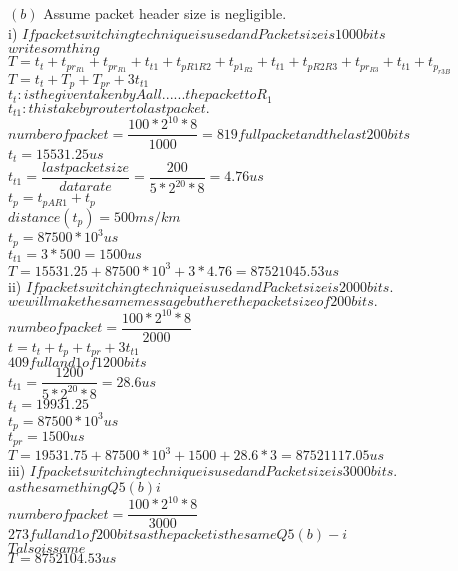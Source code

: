 \documentclass[a4paper,12pt]{article}
\begin{document}
$ (b) $ Assume packet header size is negligible. \\

i) $ If packet switching technique is used and Packet size is 1000 bits $\\

$ write somthing $\\

$T= t_{t}+t_{pr_{R1}}+t_{pr_{R1}}+t_{t1}+t_{pR1R2}+t_{p1_{R2}}+t_{t1}+t_{pR2R3}+t_{pr_{R3}}+t_{t1}+t_{p_{r3B}}$\\
$T= t_{t}+T_{p}+T_{pr}+3t_{t1}$\\

$ t_{t}:is the given taken by A all...... the packet to R_{1}$\\
$ t_{t1}:this take by router to last packet.$\\
$ number of packet =\dfrac{100*2^{10}*8}{1000}=819 full packet and the last 200 bits $\\
$ t_{t}=15531.25 us$\\
$ t_{t1}=\dfrac{last packet size}{data rate}=\dfrac{200}{5*2^{20}*8}=4.76 us$\\
$ t_{p}=t_{pAR1}+t_{p}$\\
$ distance ( t_{p} ) =500ms/km$\\
$ t_{p}=87500*10^{3}us$\\
$ t_{t1}=3*500=1500us$\\
$ T=15531.25+87500*10^{3}+3*4.76=87521045.53us $\\

ii) $ If packet switching technique is used and Packet size is 2000 bits.$\\


$ we will make the same message but here the packet size of 200 bits.$\\
$ numbe of packet=\dfrac{100*2^{10}*8}{2000}$\\
$ t =t_{t}+t_{p}+t_{pr}+3t_{t1}$\\
$ 409 full and 1 of 1200 bits$\\
$ t_{t1}=\dfrac{1200}{5*2^{20}*8}=28.6 us $\\
$ t_{t}=19931.25$\\
$ t_{p}=87500*10^{3}us$\\
$ t_{pr}=1500 us$\\
$ T = 19531.75+87500*10^{3}+1500+28.6*3=87521117.05 us $\\


iii) $ If packet switching technique is used and Packet size is 3000 bits.$\\
$ as the same thing Q5 (b)i $\\
$ number of packet=\dfrac{100*2^{10}*8}{3000}$\\
$ 273 full and 1 of 200 bits as the packet is the same Q5(b)-i$\\
$ T also is same $\\
$ T = 8752104.53 us $\\
\end{document}
